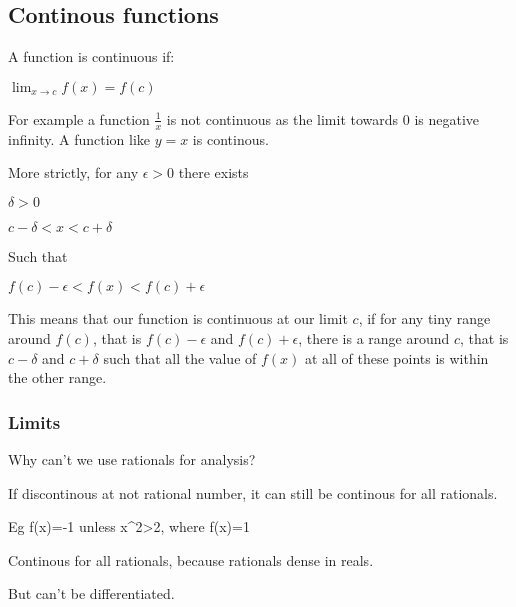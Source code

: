 
\subsection{Continous functions}

A function is continuous if:

\(\lim_{x\rightarrow c} f(x)=f(c)\)

For example a function \(\frac{1}{x}\) is not continuous as the limit towards \(0\) is negative infinity. A function like \(y=x\) is continous.

More strictly, for any \(\epsilon >0\) there exists

\(\delta >0 \)

\(c-\delta < x< c +\delta \)

Such that

\(f(c)-\epsilon < f(x) < f(c)+\epsilon \)

This means that our function is continuous at our limit \(c\), if for any tiny range around \(f(c)\), that is \(f(c)-\epsilon\) and \(f(c)+\epsilon\), there is a range around \(c\), that is \(c-\delta \) and \(c+ \delta \) such that all the value of \(f(x)\) at all of these points is within the other range.

\subsubsection{Limits}

Why can't we use rationals for analysis?

If discontinous at not rational number, it can still be continous for all rationals.

Eg f(x)=-1 unless x^2>2, where f(x)=1

Continous for all rationals, because rationals dense in reals.

But can't be differentiated.

